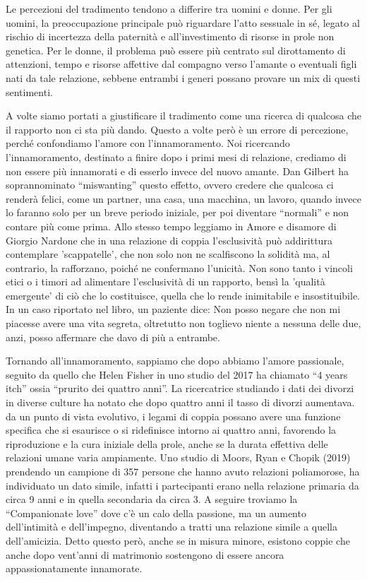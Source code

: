 \documentclass[12pt]{book} %
\begin{document}
Le percezioni del tradimento tendono a differire tra uomini e donne. Per gli uomini, la preoccupazione principale può riguardare l'atto sessuale in sé, legato al rischio di incertezza della paternità e all'investimento di risorse in prole non genetica. Per le donne, il problema può essere più centrato sul dirottamento di attenzioni, tempo e risorse affettive dal compagno verso l'amante o eventuali figli nati da tale relazione, sebbene entrambi i generi possano provare un mix di questi sentimenti.

A volte siamo portati a giustificare il tradimento come una ricerca di qualcosa che il rapporto non ci sta più dando.
Questo a volte però è un errore di percezione, perché confondiamo l'amore con
l'innamoramento. Noi ricercando l'innamoramento, destinato a finire dopo i
primi mesi di relazione, crediamo di non essere più innamorati e di esserlo invece del nuovo amante. 
Dan Gilbert ha soprannominato “miswanting” questo effetto, ovvero credere che qualcosa ci renderà felici, come un partner,
una casa, una macchina, un lavoro, quando invece lo faranno solo per un breve periodo iniziale, per poi
diventare “normali” e non contare più come prima. 
Allo stesso tempo leggiamo in Amore e disamore di Giorgio Nardone che
in una relazione di coppia l'esclusività può addirittura contemplare
'scappatelle', che non solo non ne scalfiscono la solidità ma, al contrario,
la rafforzano, poiché ne confermano l'unicità.
Non sono tanto i vincoli etici o i timori ad alimentare l'esclusività di un rapporto, bensì la
'qualità emergente' di ciò che lo costituisce, quella che lo rende
inimitabile e insostituibile. In un caso riportato nel libro, un paziente dice: Non posso negare che non mi piacesse
avere una vita segreta, oltretutto non toglievo niente a nessuna delle due, anzi, posso affermare che davo di più a entrambe.

Tornando all'innamoramento, sappiamo che dopo abbiamo l'amore passionale, seguito da quello che
Helen Fisher in uno studio del 2017 ha chiamato “4 years itch” ossia “prurito dei quattro anni”. La ricercatrice
studiando i dati dei divorzi in diverse culture ha notato che dopo quattro anni il tasso di divorzi aumentava. da un punto di vista evolutivo, i legami di coppia possano avere una funzione specifica che si esaurisce o si ridefinisce intorno ai quattro anni, favorendo la riproduzione e la cura iniziale della prole, anche se la durata effettiva delle relazioni umane varia ampiamente. Uno studio
di Moors, Ryan e Chopik (2019) prendendo un campione di 357 persone che hanno avuto relazioni poliamorose, ha
individuato un dato simile, infatti i partecipanti erano nella relazione primaria da circa 9 anni e in quella
secondaria da circa 3. A seguire troviamo la “Companionate love” dove c'è un calo della passione,
ma un aumento dell'intimità e dell'impegno, diventando a tratti una relazione
simile a quella dell'amicizia. Detto questo però, anche se in misura minore, esistono
coppie che anche dopo vent'anni di matrimonio sostengono di essere ancora appassionatamente
innamorate. 
\end{document}
